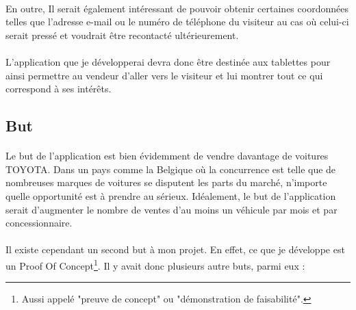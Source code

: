 \documentclass[12pt]{report}
\begin{document}
\paragraph{}
En outre, Il serait également intéressant de pouvoir obtenir certaines coordonnées telles que l'adresse e-mail ou le  numéro de téléphone du visiteur au cas où celui-ci serait pressé et voudrait être recontacté ultérieurement.

\paragraph{}
L'application que je développerai devra donc être destinée aux tablettes pour ainsi permettre au vendeur d'aller vers le visiteur et lui montrer tout ce qui correspond à ses intérêts.

\subsection{But}
\paragraph{}
Le but de l'application est bien évidemment de vendre davantage de voitures TOYOTA. Dans un pays comme la Belgique où la concurrence est telle que de nombreuses marques de voitures se disputent les parts du marché, n'importe quelle opportunité est à prendre au sérieux. Idéalement, le but de l'application serait d'augmenter le nombre de ventes d'au moins un véhicule par mois et par concessionnaire.

\paragraph{}
Il existe cependant un second but à mon projet. En effet, ce que je développe est un Proof Of Concept\footnote{Aussi appelé "preuve de concept" ou "démonstration de faisabilité".}. Il y avait donc plusieurs autre buts, parmi eux :
\end{document}
